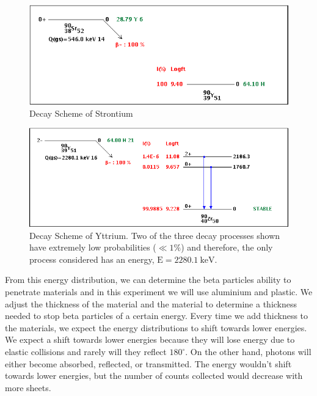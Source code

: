 \begin{figure}
	[tbp] \centering 
	\includegraphics[width=.9
	\textwidth]{Figures/90SrDecay.png} \caption{Decay Scheme of Strontium} \label{fig:Figures_90SrDecay} 
\end{figure}%
\begin{figure}
	[tbp] \centering 
	\includegraphics[width=.9
	\textwidth]{Figures/90YDecay.png} \caption{Decay Scheme of Yttrium.  Two of the three decay processes shown have extremely low probabilities ($\ll 1\%$) and therefore, the only process considered has an energy, $\text{E}=2280.1~\text{keV}$.} \label{fig:Figures_90YDecay} 
\end{figure}%


From this energy distribution, we can determine the beta particles ability to penetrate materials and in this experiment we will use aluminium and plastic. We adjust the thickness of the material and the material to determine a thickness needed to stop beta particles of a certain energy. Every time we add thickness to the materials, we expect the energy distributions to shift towards lower energies.  We expect a shift towards lower energies because they will lose energy due to elastic collisions and rarely will they reflect $180^\circ$.  On the other hand, photons will either become absorbed, reflected, or transmitted.  The energy wouldn't shift towards lower energies, but the number of counts collected would decrease with more sheets.


